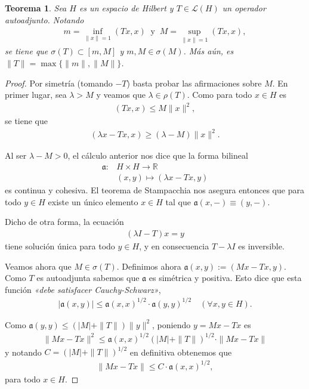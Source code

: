 \documentclass[11pt]{report}
\theoremstyle{colored}
\newtheorem{theorem}{Teorema}[section]
\newcommand{\R}{\mathbb{R}}
\newcommand{\ip}[1]{( #1 )}
\begin{document}
\begin{theorem} Sea $H$ es un espacio de Hilbert y $T \in \mathscr{L}(H)$ un operador autoadjunto. Notando
\begin{align*}
m = \inf_{\|x\| = 1}(Tx,x) \ \text{ y } \ M = \sup_{\|x\| = 1}(Tx,x),
\end{align*}
se tiene que $\sigma(T) \subset [m,M]$ y $m,M \in \sigma(M)$. Más aún, es $\|T\| = \max\{\|m\|,\|M\|\}$.
\end{theorem}
\begin{proof} Por simetría (tomando $-T$) basta probar las afirmaciones sobre $M$. En primer lugar, sea $\lambda > M$ y veamos que $\lambda \in \rho(T)$. Como para todo $x \in H$ es
\begin{align*}
\ip{Tx,x} \leq M \|x\|^2,
\end{align*}
se tiene que
\begin{align*}
(\lambda x - Tx,x) \geq (\lambda - M)\|x\|^2.
\end{align*}

Al ser $\lambda - M > 0$, el cálculo anterior nos dice que la forma bilineal
\begin{align*}
\mathfrak{a} : &H \times H \to \R\\
&(x,y) \mapsto (\lambda x -T x, y)
\end{align*}
es continua y cohesiva. El teorema de Stampacchia nos asegura entonces que para todo $y \in H$ existe un único elemento $x \in H$ tal que $\mathfrak{a}(x,-) \equiv \ip{y,-}$.

Dicho de otra forma, la ecuación
\begin{align*}
(\lambda I -T)x = y
\end{align*}
tiene solución única para todo $y \in H$, y en consecuencia $T- \lambda I$ es inversible.

Veamos ahora que $M \in \sigma(T)$. Definimos ahora $\mathfrak{a}(x,y) := (Mx-Tx,y)$. Como $T$ es autoadjunta sabemos que $\mathfrak{a}$ es simétrica y positiva. Esto dice que esta función \textit{«debe satisfacer Cauchy-Schwarz»}, 
\begin{align*}
|\mathfrak{a}(x,y)| \leq \mathfrak{a}(x,x)^{1/2} \cdot \mathfrak{a}(y,y)^{1/2} \quad (\forall x,y \in H).
\end{align*}

Como $\mathfrak{a}(y,y) \leq (|M|+\|T\|)\|y\|^2$, poniendo $y = Mx-Tx$ es
\begin{align*}
\|Mx-Tx\|^2 \leq \mathfrak{a}(x,x)^{1/2}(|M|+\|T\|)^{1/2} \cdot \|Mx-Tx\|
\end{align*}
y  notando $C = (|M|+\|T\|)^{1/2}$ en definitiva obtenemos que
\begin{align*}
\|Mx-Tx\| \leq C \cdot \mathfrak{a}(x,x)^{1/2},
\end{align*}
para todo $x \in H$.


\end{proof}
\end{document}
